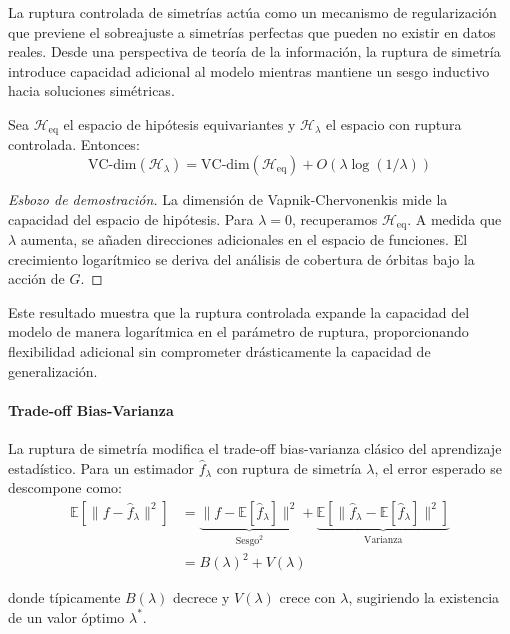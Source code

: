 La ruptura controlada de simetrías actúa como un mecanismo de regularización que previene el sobreajuste a simetrías perfectas que pueden no existir en datos reales. Desde una perspectiva de teoría de la información, la ruptura de simetría introduce capacidad adicional al modelo mientras mantiene un sesgo inductivo hacia soluciones simétricas.

\begin{theorem}
Sea $\mathcal{H}_{\text{eq}}$ el espacio de hipótesis equivariantes y $\mathcal{H}_{\lambda}$ el espacio con ruptura controlada. Entonces:
\[\text{VC-dim}(\mathcal{H}_{\lambda}) = \text{VC-dim}(\mathcal{H}_{\text{eq}}) + O(\lambda \log(1/\lambda))\]
\end{theorem}

\begin{proof}[Esbozo de demostración]
La dimensión de Vapnik-Chervonenkis mide la capacidad del espacio de hipótesis. Para $\lambda = 0$, recuperamos $\mathcal{H}_{\text{eq}}$. A medida que $\lambda$ aumenta, se añaden direcciones adicionales en el espacio de funciones. El crecimiento logarítmico se deriva del análisis de cobertura de órbitas bajo la acción de $G$.
\end{proof}

Este resultado muestra que la ruptura controlada expande la capacidad del modelo de manera logarítmica en el parámetro de ruptura, proporcionando flexibilidad adicional sin comprometer drásticamente la capacidad de generalización.

\paragraph{Trade-off Bias-Varianza}

La ruptura de simetría modifica el trade-off bias-varianza clásico del aprendizaje estadístico. Para un estimador $\hat{f}_\lambda$ con ruptura de simetría $\lambda$, el error esperado se descompone como:
\begin{align}
\mathbb{E}[\|f - \hat{f}_\lambda\|^2] &= \underbrace{\|f - \mathbb{E}[\hat{f}_\lambda]\|^2}_{\text{Sesgo}^2} + \underbrace{\mathbb{E}[\|\hat{f}_\lambda - \mathbb{E}[\hat{f}_\lambda]\|^2]}_{\text{Varianza}} \\
&= B(\lambda)^2 + V(\lambda)
\end{align}

donde típicamente $B(\lambda)$ decrece y $V(\lambda)$ crece con $\lambda$, sugiriendo la existencia de un valor óptimo $\lambda^*$.

